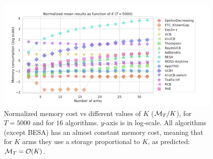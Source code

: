 \begin{figure}[h!]  %
	\includegraphics[width=1.10\linewidth]{16_different_algorithms__lognormmemory_vs_arms__16pb__T5000.pdf}
	\caption[Normalized memory cost vs different values of $K$.]{
        Normalized memory cost vs different values of $K$ ($\mathcal{M}_T / K$),
        for $T=5000$ and for $16$ algorithms.
        $y$-axis is in log-scale.
        All algorithms (except BESA) has an almost constant memory cost, meaning that for $K$ arms they use a storage proportional to $K$, as predicted: $\mathcal{M}_T = \mathop{}\mathopen{}\mathcal{O}\mathopen{}\left(K\right)$.
	}
	\label{fig:3:16_different_algorithms__lognormmemory_vs_arms__16pb__T5000}
\end{figure}


